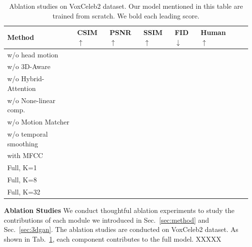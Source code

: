 \documentclass[runningheads]{llncs}
\begin{document}
\begin{table}[t]
    \centering
  \begin{tabular*}{0.9\linewidth}{  p{4.2cm} | p{1.0cm} p{1.0cm} p{1.0cm} p{1.0cm} p{1.0cm} p{1.0cm} p{1.0cm}}
      \toprule
      \hline
Method & {CSIM$\uparrow$} &{PSNR$\uparrow$}  &{SSIM$\uparrow$}&{FID$\downarrow$} &{Human$\uparrow$}  \\ \hline
{w/o head motion } & \textbf{ } &  &\bf{}  \\ %
{w/o 3D-Aware} & \textbf{ } &  &\bf{}  \\ %
{w/o Hybrid-Attention} & \textbf{ } &  &\bf{}  \\ %
{w/o None-linear comp.} & \textbf{ } &  &\bf{}  \\ %
{w/o Motion Matcher}  &     &     &     \\ %
{w/o temporal smoothing}  &     &     &     \\ %
{with MFCC} & {     } & \bf{     } &  {     } \\ %
{Full, K=1} & \textbf{     } & \textbf{     } &  \textbf{     }\\ %
{Full, K=8} & \textbf{     } & \textbf{     } &  \textbf{     }\\ %
{Full, K=32} & \textbf{     } & \textbf{     } &  \textbf{     }\\ %
  \end{tabular*}
  \caption{Ablation studies on VoxCeleb2 dataset. Our model mentioned in this table are trained from scratch. We bold each leading score.}
    \label{tab:alation}
\end{table}
\noindent \textbf{Ablation Studies} \quad We conduct thoughtful ablation experiments to study the contributions of each module we introduced in Sec.~\ref{sec:method} and Sec.~\ref{sec:3dgan}. The ablation studies are conducted on VoxCeleb2 dataset.
As shown in Tab.~\ref{tab:alation}, each component contributes to the full model. XXXXX
\end{document}
